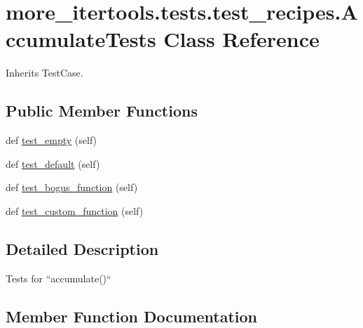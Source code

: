 \hypertarget{classmore__itertools_1_1tests_1_1test__recipes_1_1_accumulate_tests}{}\section{more\+\_\+itertools.\+tests.\+test\+\_\+recipes.\+Accumulate\+Tests Class Reference}
\label{classmore__itertools_1_1tests_1_1test__recipes_1_1_accumulate_tests}


Inherits Test\+Case.

\subsection*{Public Member Functions}
\begin{DoxyCompactItemize}
\item 
def \hyperlink{classmore__itertools_1_1tests_1_1test__recipes_1_1_accumulate_tests_a3d36688fd6a5585b815b5ffa77d66d7d}{test\+\_\+empty} (self)
\item 
def \hyperlink{classmore__itertools_1_1tests_1_1test__recipes_1_1_accumulate_tests_a57d8b9715befc564adadfc81943c63b6}{test\+\_\+default} (self)
\item 
def \hyperlink{classmore__itertools_1_1tests_1_1test__recipes_1_1_accumulate_tests_a4fce2811dc18ca8da4d5ef5f71b6e722}{test\+\_\+bogus\+\_\+function} (self)
\item 
def \hyperlink{classmore__itertools_1_1tests_1_1test__recipes_1_1_accumulate_tests_a98010d02cbcc98653c11a308f1e1bb7d}{test\+\_\+custom\+\_\+function} (self)
\end{DoxyCompactItemize}


\subsection{Detailed Description}
\begin{DoxyVerb}Tests for ``accumulate()``\end{DoxyVerb}
 

\subsection{Member Function Documentation}
\mbox{\label{classmore__itertools_1_1tests_1_1test__recipes_1_1_accumulate_tests_a4fce2811dc18ca8da4d5ef5f71b6e722}} 
